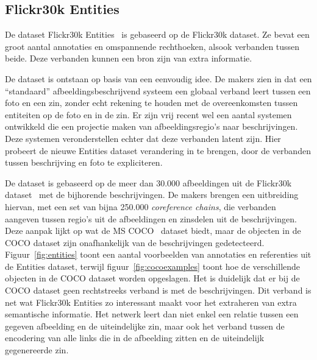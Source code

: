 \subsection{Flickr30k Entities}
\label{sec:entities}
De dataset Flickr30k Entities~\cite{Plummer2015} is gebaseerd op de Flickr30k dataset. Ze bevat een groot aantal annotaties en omspannende rechthoeken, alsook verbanden tussen beide. Deze verbanden kunnen een bron zijn van extra informatie.

De dataset is ontstaan op basis van een eenvoudig idee. De makers zien in dat een ``standaard'' afbeeldingsbeschrijvend systeem een globaal verband leert tussen een foto en een zin, zonder echt rekening te houden met de overeenkomsten tussen entiteiten op de foto en in de zin. Er zijn vrij recent wel een aantal systemen ontwikkeld die een projectie maken van afbeeldingsregio's naar beschrijvingen. Deze systemen veronderstellen echter dat deze verbanden latent zijn. Hier probeert de nieuwe Entities dataset verandering in te brengen, door de verbanden tussen beschrijving en foto te expliciteren.

De dataset is gebaseerd op de meer dan 30.000 afbeeldingen uit de Flickr30k dataset~\cite{Young2014} met de bijhorende beschrijvingen. De makers brengen een uitbreiding hiervan, met een set van bijna 250.000 \emph{coreference chains}, die verbanden aangeven tussen regio's uit de afbeeldingen en zinsdelen uit de beschrijvingen. Deze aanpak lijkt op wat de MS COCO~\cite{Lin2014} dataset biedt, maar de objecten in de COCO dataset zijn onafhankelijk van de beschrijvingen gedetecteerd. Figuur~\ref{fig:entities} toont een aantal voorbeelden van annotaties en referenties uit de Entities dataset, terwijl figuur~\ref{fig:cocoexamples} toont hoe de verschillende objecten in de COCO dataset worden opgeslagen. Het is duidelijk dat er bij de COCO dataset geen rechtstreeks verband is met de beschrijvingen. Dit verband is net wat Flickr30k Entities zo interessant maakt voor het extraheren van extra semantische informatie. Het netwerk leert dan niet enkel een relatie tussen een gegeven afbeelding en de uiteindelijke zin, maar ook het verband tussen de encodering van alle links die in de afbeelding zitten en de uiteindelijk gegenereerde zin.

